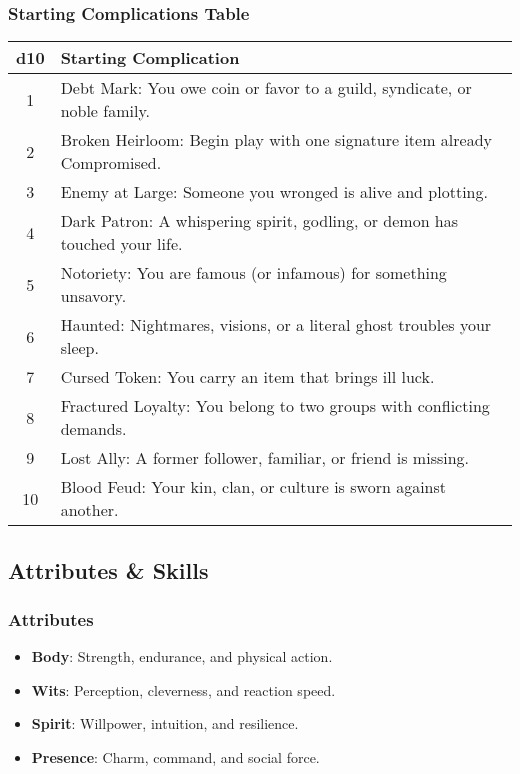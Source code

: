\documentclass[11pt]{article}
\begin{document}
\subsubsection{Starting Complications Table}
\begin{center}
\begin{tabular}{cl}
\toprule
\textbf{d10} & \textbf{Starting Complication} \\
\midrule
1 & Debt Mark: You owe coin or favor to a guild, syndicate, or noble family. \\
2 & Broken Heirloom: Begin play with one signature item already Compromised. \\
3 & Enemy at Large: Someone you wronged is alive and plotting. \\
4 & Dark Patron: A whispering spirit, godling, or demon has touched your life. \\
5 & Notoriety: You are famous (or infamous) for something unsavory. \\
6 & Haunted: Nightmares, visions, or a literal ghost troubles your sleep. \\
7 & Cursed Token: You carry an item that brings ill luck. \\
8 & Fractured Loyalty: You belong to two groups with conflicting demands. \\
9 & Lost Ally: A former follower, familiar, or friend is missing. \\
10 & Blood Feud: Your kin, clan, or culture is sworn against another. \\
\bottomrule
\end{tabular}
\end{center}

\subsection{Attributes \& Skills}

\subsubsection{Attributes}
\begin{itemize}
    \item \textbf{Body}: Strength, endurance, and physical action.
    \item \textbf{Wits}: Perception, cleverness, and reaction speed.
    \item \textbf{Spirit}: Willpower, intuition, and resilience.
    \item \textbf{Presence}: Charm, command, and social force.
\end{itemize}
\end{document}

